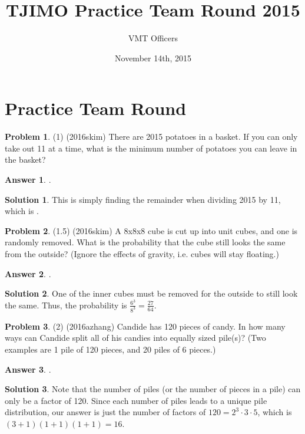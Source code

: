 \documentclass{article}
\title{TJIMO Practice Team Round 2015}
\author{VMT Officers}
\date{November 14th, 2015}
\theoremstyle{definition}
\newtheorem{problem}{Problem}
\newtheorem*{solution}{Solution}
\newtheorem*{answer}{Answer}
\begin{document}
\maketitle

\section{Practice Team Round}
\begin{problem}
(1) (2016skim) There are 2015 potatoes in a basket. If you can only take out 11 at a time, what is the minimum number of potatoes you can leave in the basket?
\end{problem}

\begin{answer}
.
\end{answer}

\begin{solution}
This is simply finding the remainder when dividing 2015 by 11, which is .
\end{solution}

\begin{problem}
(1.5) (2016skim) A 8x8x8 cube is cut up into unit cubes, and one is randomly removed. What is the probability that the cube still looks the same from the outside? (Ignore the effects of gravity, i.e. cubes will stay floating.)
\end{problem}

\begin{answer}
.
\end{answer}

\begin{solution}
One of the inner cubes must be removed for the outside to still look the same. Thus, the probability is $\frac{6^3}{8^3} = \boxed{\frac{27}{64}}$.
\end{solution}

\begin{problem}
(2) (2016azhang) Candide has 120 pieces of candy. In how many ways can Candide split all of his candies into equally sized pile(s)? (Two examples are 1 pile of 120 pieces, and 20 piles of 6 pieces.)
\end{problem}

\begin{answer}
.
\end{answer}

\begin{solution}
Note that the number of piles (or the number of pieces in a pile) can only be a factor of 120. Since each number of piles leads to a unique pile distribution, our answer is just the number of factors of $120 = 2^{3}\cdot3\cdot5$, which is $(3+1)(1+1)(1+1) = \boxed{16}$.
\end{solution}
\end{document}
